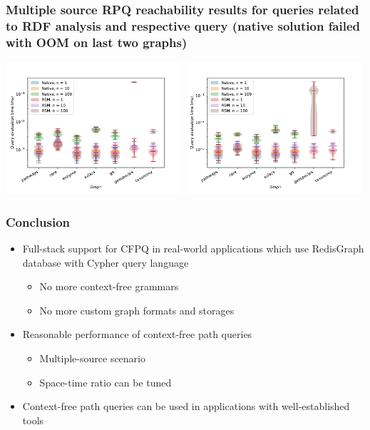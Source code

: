 \documentclass[xcolor=table,aspectratio=169]{beamer}
\begin{document}
\begin{frame}[fragile] \frametitle{Multiple source RPQ reachability results for queries related to RDF analysis and respective query (native solution failed with OOM on last two graphs)}
  \begin{center}        
    \includegraphics[width=0.49\textwidth]{pictures/reg1_rpq_result.pdf}
    \includegraphics[width=0.49\textwidth]{pictures/reg2_rpq_result.pdf}
  \end{center}
\end{frame}

\begin{frame}[fragile] \frametitle{Conclusion}
  \begin{itemize}
      \item Full-stack support for CFPQ in real-world applications which use RedisGraph database with Cypher query language
      \begin{itemize}
         \item No more context-free grammars
         \item No more custom graph formats and storages
      \end{itemize}
      \item Reasonable performance of context-free path queries
      \begin{itemize}
         \item Multiple-source scenario
         \item Space-time ratio can be tuned
      \end{itemize}
      \item Context-free path queries can be used in applications with well-established tools
  \end{itemize}
\end{frame}
\end{document}
